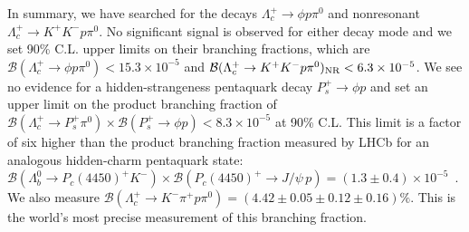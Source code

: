 \documentclass[aps,prl,twocolumn,superscriptaddress,showpacs,preprintnumbers,amsmath,amssymb]{revtex4-1}
\begin{document}
In summary,  we have searched for the decays $\Lambda_c^+\to\phi p\pi^0$ and nonresonant $\Lambda_c^+\to K^+K^- p\pi^0$. No significant signal is observed for either decay mode and we set 90\% C.L. upper limits on their branching fractions, which are
$\mathcal{B}(\Lambda_c^+\to \phi p\pi^0) < 15.3\times10^{-5}$ and 
$\mathcal{B}(\Lambda_c^+\to K^+K^-p\pi^0)_{\rm NR} <6.3\times10^{-5}$.
We see no evidence for a hidden-strangeness pentaquark decay $P_s^+\to \phi p$ and set an upper limit on the product branching fraction of  $\mathcal{B}(\Lambda_c^+\to P_s^+\pi^0) \times \mathcal{B}(P_s^+\to \phi p)<8.3\times10^{-5}$ at 90\% C.L. This limit is a factor of six higher than the product branching fraction measured 
by LHCb for an analogous hidden-charm pentaquark state: 
$\mathcal{B}(\Lambda_b^0\to P_c(4450)^+ K^-) \times 
\mathcal{B}(P_c(4450)^+\to J/\psi\,p)=(1.3\pm 0.4)\times10^{-5}$~\cite{Aaij:2015tga}.
We also measure 
$\mathcal{B}(\Lambda_c^+\to K^-\pi^+p\pi^0)=(4.42\pm0.05\pm 0.12\pm0.16)\%$.
This is the world's most precise measurement of this branching fraction.
\end{document}
